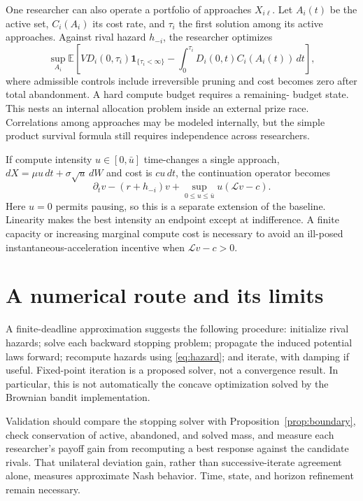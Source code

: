 \documentclass[11pt]{article}
\newcommand{\E}{\mathbb E}
\newcommand{\ind}{\mathbf 1}
\newcommand{\Lgen}{\mathcal L}
\begin{document}
One researcher can also operate a portfolio of approaches $X_{i\ell}$.
Let $A_i(t)$ be the active set, $C_i(A_i)$ its cost rate, and $\tau_i$ the
first solution among its active approaches. Against rival hazard $h_{-i}$,
the researcher optimizes
\begin{equation}\label{eq:portfolio}
\sup_{A_i}\E\left[
VD_i(0,\tau_i)\ind_{\{\tau_i<\infty\}}
-\int_0^{\tau_i}D_i(0,t)C_i(A_i(t))\,dt\right],
\end{equation}
where admissible controls include irreversible pruning and cost becomes
zero after total abandonment. A hard compute budget requires a remaining-
budget state. This nests an internal allocation problem inside an external
prize race. Correlations among approaches may be modeled internally, but
the simple product survival formula still requires independence across
researchers.

If compute intensity $u\in[0,\bar u]$ time-changes a single approach,
$dX=\mu u\,dt+\sigma\sqrt u\,dW$ and cost is $cu\,dt$, the continuation
operator becomes
\begin{equation}\label{eq:intensity}
\partial_t v-(r+h_{-i})v
+\sup_{0\le u\le\bar u}u(\Lgen v-c).
\end{equation}
Here $u=0$ permits pausing, so this is a separate extension of the baseline.
Linearity makes the best intensity an endpoint except at indifference.
A finite capacity or increasing marginal compute cost is necessary to avoid
an ill-posed instantaneous-acceleration incentive when $\Lgen v-c>0$.

\section{A numerical route and its limits}
A finite-deadline approximation suggests the following procedure: initialize
rival hazards; solve each backward stopping problem; propagate the induced
potential laws forward; recompute hazards using \eqref{eq:hazard}; and
iterate, with damping if useful. Fixed-point iteration is a proposed solver,
not a convergence result. In particular, this is not automatically the
concave optimization solved by the Brownian bandit implementation.

Validation should compare the stopping solver with
Proposition~\ref{prop:boundary}, check conservation of active, abandoned,
and solved mass, and measure each researcher's payoff gain from recomputing
a best response against the candidate rivals. That unilateral deviation
gain, rather than successive-iterate agreement alone, measures approximate
Nash behavior. Time, state, and horizon refinement remain necessary.
\end{document}
